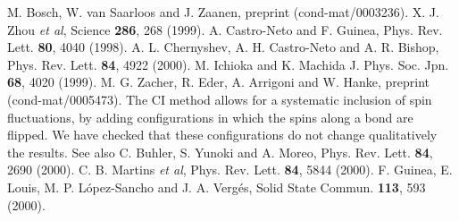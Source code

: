 \begin{thebibliography}{}
M. Bosch, W. van Saarloos and J. Zaanen, preprint (cond-mat/0003236).
X. J. Zhou {\it et al}, Science {\bf  286}, 268 (1999).
A. Castro-Neto and F. Guinea, Phys. Rev. Lett. {\bf 80}, 4040 (1998).
A. L. Chernyshev, A. H. Castro-Neto and A. R. Bishop, Phys. Rev. Lett.
{\bf 84}, 4922 (2000).
M. Ichioka and K. Machida 
J. Phys. Soc. Jpn. {\bf 68}, 4020 (1999).
M. G. Zacher, R. Eder, A. Arrigoni and W. Hanke, preprint (cond-mat/0005473).
The CI method allows for a systematic inclusion of spin fluctuations, by adding 
configurations in which the spins along a bond are flipped. We have checked that
these configurations do not change qualitatively the results. See also
C. Buhler, S. Yunoki and A. Moreo, Phys. Rev. Lett. {\bf 84}, 2690 (2000).
C. B. Martins {\it et al}, Phys. Rev. Lett. {\bf 84}, 5844 (2000).
F. Guinea, E. Louis, M. P. L\'opez-Sancho and J. A. Verg\'es,
Solid State Commun. {\bf 113}, 593 (2000).
\end{thebibliography}



